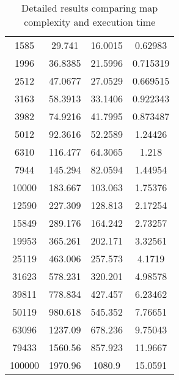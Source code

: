 \begin{table}[ht!]
{\begin{tabular}{| c | c c c |}
        1585 & 29.741   & 16.0015  & 0.62983 \\
        1996 & 36.8385  & 21.5996  & 0.715319 \\
        2512 & 47.0677  & 27.0529  & 0.669515 \\
        3163 &  58.3913 &  33.1406 & 0.922343 \\
        3982 &  74.9216 &  41.7995 & 0.873487 \\
        5012 &  92.3616 &  52.2589 & 1.24426 \\ 
        6310 & 116.477  &  64.3065 & 1.218 \\
        7944 & 145.294  &  82.0594 & 1.44954 \\
        10000 & 183.667  & 103.063  & 1.75376 \\
        12590 & 227.309  & 128.813  & 2.17254 \\
        15849 & 289.176  & 164.242  & 2.73257 \\
        19953 & 365.261  & 202.171  & 3.32561 \\
        25119 & 463.006  & 257.573  & 4.1719 \\
        31623 &  578.231 &  320.201 &  4.98578 \\
        39811 &  778.834 &  427.457 &  6.23462 \\
        50119 &  980.618 &  545.352 &  7.76651 \\
        63096 & 1237.09  &  678.236 &  9.75043 \\
        79433 & 1560.56  &  857.923 & 11.9667 \\
        100000 & 1970.96  & 1080.9   & 15.0591 \\
        \hline
        \end{tabular}
    }
    \caption{Detailed results comparing map complexity and execution time}
    \label{tb:steps}
\end{table}

